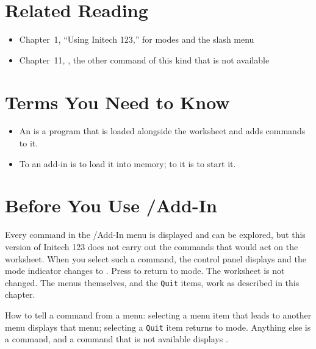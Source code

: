 \section{Related Reading}
\begin{itemize}
\item Chapter~1, ``Using Initech 123,'' for modes and the slash menu
\item Chapter~11, , the other command of this kind that is not available
\end{itemize}

\section{Terms You Need to Know}
\begin{itemize}
\item An  is a program that is loaded alongside the worksheet and adds commands to it.
\item To  an add-in is to load it into memory; to  it is to start it.
\end{itemize}

\section{Before You Use /Add-In}
\begin{Note}
Every command in the /Add-In menu is displayed and can be explored, but this
version of Initech 123 does not carry out the commands that would act on the
worksheet.  When you select such a command, the control panel displays
 and the mode indicator changes to
.  Press  to return to  mode.  The worksheet
is not changed.  The menus themselves, and the \texttt{Quit} items, work as
described in this chapter.
\end{Note}
How to tell a command from a menu: selecting a menu item that leads to another
menu displays that menu; selecting a \texttt{Quit} item returns to
 mode.  Anything else is a command, and a command that is not
available displays .

